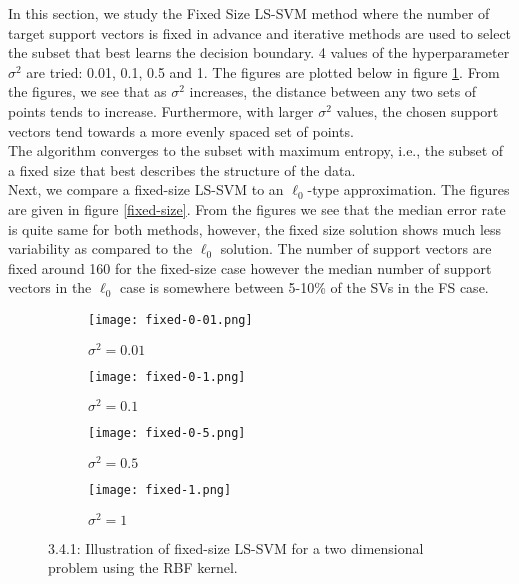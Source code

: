 \documentclass[paper=a4, fontsize=11pt]{scrartcl} %
\numberwithin{equation}{section} %
\begin{document}
In this section, we study the Fixed Size LS-SVM method where the number of target support vectors is fixed in advance and iterative methods are used to select the subset that best learns the decision boundary. 4 values of the hyperparameter $\sigma^2$ are tried: 0.01, 0.1, 0.5 and 1. The figures are plotted below in figure \ref{fixed-size-1}. From the figures, we see that as $\sigma^2$ increases, the distance between any two sets of points tends to increase. Furthermore, with larger $\sigma^2$ values, the chosen support vectors tend towards a more evenly spaced set of points.\\

The algorithm converges to the subset with maximum entropy, i.e., the subset of a fixed size that best describes the structure of the data.\\

Next, we compare a fixed-size LS-SVM to an $\ell_0$-type approximation. The figures are given in figure \ref{fixed-size}. From the figures we see that the median error rate is quite same for both methods, however, the fixed size solution shows much less variability as compared to the $\ell_0$ solution. The number of support vectors are fixed around 160 for the fixed-size case however the median number of support vectors in the $\ell_0$ case is somewhere between 5-10\% of the SVs in the FS case.

\begin{figure}[ht]
\centering
	\begin{subfigure}[b]{0.25\textwidth}
		\centering
		\texttt{[image: fixed-0-01.png]}
		\caption{$\sigma^2 = 0.01$}
	\end{subfigure}%
	\begin{subfigure}[b]{0.25\textwidth}
		\centering
		\texttt{[image: fixed-0-1.png]}
		\caption{$\sigma^2 = 0.1$}
	\end{subfigure}%
	\begin{subfigure}[b]{0.25\textwidth}
		\centering
		\texttt{[image: fixed-0-5.png]}
		\caption{$\sigma^2 = 0.5$}
	\end{subfigure}%
	\begin{subfigure}[b]{0.25\textwidth}
		\centering
		\texttt{[image: fixed-1.png]}
		\caption{$\sigma^2 = 1$}
	\end{subfigure}
\caption{3.4.1: Illustration of fixed-size LS-SVM for a two dimensional problem using the RBF kernel.}
\label{fixed-size-1}
\end{figure}
\end{document}
